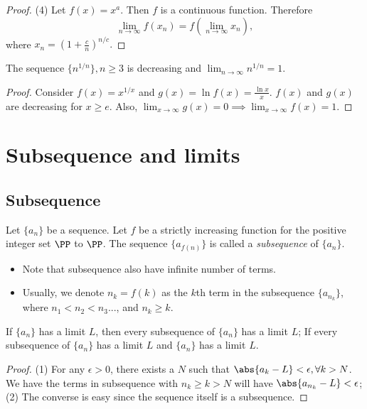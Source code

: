 \begin{refsection}
\begin{proof}
(4)
Let $f(x) = x^a$. Then $f$ is a continuous function. Therefore
$$\lim_{n\to \infty} f(x_n) = f(\lim_{n\to \infty} x_n), $$
where $x_n = (1 + \frac{c}{n})^{n/c}.$
\end{proof}

\begin{lemma}
The sequence $\{n^{1/n}\},n\geq 3$ is decreasing and $\lim_{n\to \infty} n^{1/n} = 1.$
\end{lemma}
\begin{proof}
Consider $f(x) = x^{1/x}$ and $g(x) = \ln f(x) = \frac{\ln x}{x}$. $f(x)$ and $g(x)$ are decreasing for $x\geq e$. Also, $\lim_{x\to \infty} g(x) = 0 \implies  \lim_{x\to \infty} f(x) = 1$.
\end{proof}


\section{Subsequence and limits}



\subsection{Subsequence} 
\begin{definition}[subsequence]\cite[39]{johnsonbaugh2010foundations}
Let $\{a_n\}$ be a sequence. Let $f$ be a strictly increasing function for the positive integer set $\PP$ to $\PP$. The sequence $\{a_{f(n)}\}$ is called a \emph{subsequence} of $\{a_n\}$. 
\end{definition}

\begin{remark}\hfill
\begin{itemize}
    \item Note that subsequence also have infinite number of terms.
    \item Usually, we denote $n_k = f(k)$ as the $k$th term in the subsequence $\{a_{n_k}\}$, where $n_1 < n_2 < n_3...$, and $n_k \geq k$.
\end{itemize}
\end{remark}
 

\begin{theorem}\cite[39]{johnsonbaugh2010foundations}
If $\{a_n\}$ has a limit $L$, then every subsequence of $\{a_n\}$ has a limit $L$; If every subsequence of $\{a_n\}$ has a limit $L$ and $\{a_n\}$ has a limit $L$. 
\end{theorem}
\begin{proof}
(1) For any $\epsilon >0$, there exists a $N$ such that $\abs{a_k - L} < \epsilon,\forall k > N$.  We have the terms in subsequence with $n_k \geq k > N$ will have $\abs{a_{n_k} - L} < \epsilon$; (2) The converse is easy since the sequence itself is a subsequence.	
\end{proof}


\end{refsection}
